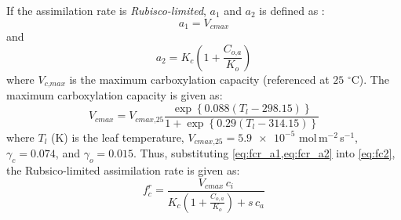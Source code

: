 If the assimilation rate is \textit{Rubisco-limited}, $a_1$ and $a_2$ is defined as \citep{Manoli2014,Katul2010}:
\begin{equation}
a_1 = V_{\textit{cmax}}
\label{eq:fcr_a1}
\end{equation} 
and
\begin{equation}
a_2 = K_c \left(1 + \frac{C_{\textit{o,a}}}{K_o}\right)
\label{eq:fcr_a2}
\end{equation} 
where $V_{\textit{c,max}}$ is the maximum carboxylation capacity (referenced at $25$ $^{\circ}$C). The maximum carboxylation capacity is given as:
\begin{equation}
V_{\textit{cmax}} = V_{\textit{cmax,25}} \frac{ \exp\left\{ 0.088 \left(T_l - 298.15\right)\right\} }{1 + \exp\left\{0.29\left(T_l - 314.15\right)\right\} }
\end{equation}
where $T_l$ (K) is the leaf temperature, $V_{\textit{cmax,25}} = \num{5.9e-5}$ mol\,m$^{-2}$\,s$^{-1}$,
$\gamma_c = 0.074$, and $\gamma_o = 0.015$. Thus, substituting \cref{eq:fcr_a1,eq:fcr_a2} into \cref{eq:fc2}, the Rubsico-limited assimilation rate is given as:
\begin{equation}
f_c^r = \frac{V_{\textit{cmax}}\,c_i}{K_c \left(1 + \frac{C_{o,a}}{K_o}\right) + s\,c_a}
\end{equation}
%
